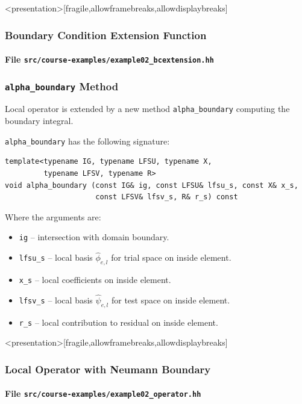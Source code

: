 \begin{frame}<presentation>[fragile,allowframebreaks,allowdisplaybreaks]
\frametitle<presentation>{Boundary Condition Extension Function}
\framesubtitle<presentation>{File \texttt{src/course-examples/example02\_bcextension.hh}}

\end{frame}

\begin{frame}[fragile]
\frametitle{\lstinline{alpha_boundary} Method}
Local operator is extended by a new method \lstinline{alpha_boundary}
computing the boundary integral.

\lstinline{alpha_boundary} has the following signature: 
\begin{lstlisting}[basicstyle=\scriptsize]
template<typename IG, typename LFSU, typename X, 
         typename LFSV, typename R>
void alpha_boundary (const IG& ig, const LFSU& lfsu_s, const X& x_s, 
                     const LFSV& lfsv_s, R& r_s) const
\end{lstlisting}
Where the arguments are:
\begin{itemize}
\item \lstinline{ig} -- intersection with domain boundary.
\item \lstinline{lfsu_s} -- local basis $\hat\phi_{e,l}$ for trial space on inside element.
\item \lstinline{x_s} -- local coefficients on inside element.
\item \lstinline{lfsv_s} -- local basis $\hat\psi_{e,l}$ for test space on inside element. 
\item \lstinline{r_s} -- local contribution to residual on inside element.
\end{itemize}
\end{frame}


\begin{frame}<presentation>[fragile,allowframebreaks,allowdisplaybreaks]
\frametitle<presentation>{Local Operator with Neumann Boundary}
\framesubtitle<presentation>{File \texttt{src/course-examples/example02\_operator.hh}}

\end{frame}

